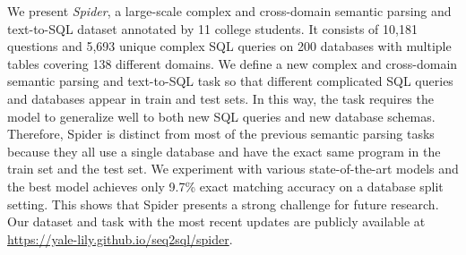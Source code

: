 We present \textit{Spider}, a large-scale complex and cross-domain semantic parsing and text-to-SQL dataset annotated by 11 college students. It consists of 10,181 questions and 5,693 unique complex SQL queries on 200 databases with multiple tables covering 138 different domains. We define a new complex and cross-domain semantic parsing and text-to-SQL task so that different complicated SQL queries and databases appear in train and test sets. In this way, the task requires the model to generalize well to both new SQL queries and new database schemas. Therefore, Spider is distinct from most of the previous semantic parsing tasks because they all use a single database and have the exact same program in the train set and the test set. We experiment with various state-of-the-art models and the best model achieves only 9.7\% exact matching accuracy on a database split setting. This shows that Spider presents a strong challenge for future research. Our dataset and task with the most recent updates are publicly available at \url{https://yale-lily.github.io/seq2sql/spider}.
